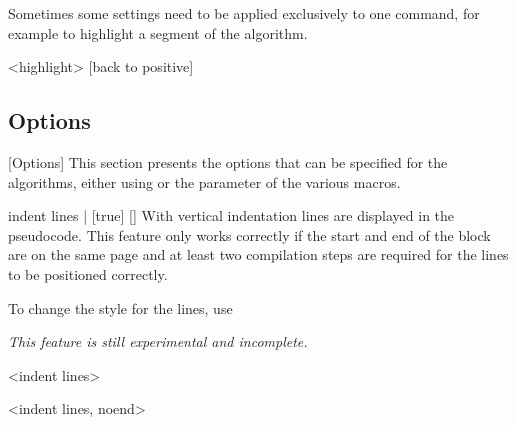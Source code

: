 \documentclass[a4paper, 11pt]{article}
\begin{document}
Sometimes some settings need to be applied exclusively to one command, for example to highlight a segment of the algorithm.

\begin{tcblisting}{}
    \begin{algorithmic}
        <highlight>
            [back to positive]
        \EndIf
    \end{algorithmic}
\end{tcblisting}

\subsection{Options}\label{sec:options}
[Options]%
This section presents the options that can be specified for the algorithms, either using  or the  parameter of the various macros.

\begin{option}{indent lines}{ | }[true]
    []%
    With  vertical indentation lines are displayed in the pseudocode. This feature only works correctly if the start and end of the block are on the same page and at least two compilation steps are required for the lines to be positioned correctly.

    To change the style for the lines, use 

    \textit{This feature is still experimental and incomplete.}
\end{option}

\begin{tcblisting}{}
    \begin{algorithmic}<indent lines>
                \EndIf
            \EndFor
        \EndFor
    \end{algorithmic}

    \begin{algorithmic}<indent lines, noend>
                \EndIf
            \EndFor
        \EndFor
    \end{algorithmic}
\end{tcblisting}
\end{document}
